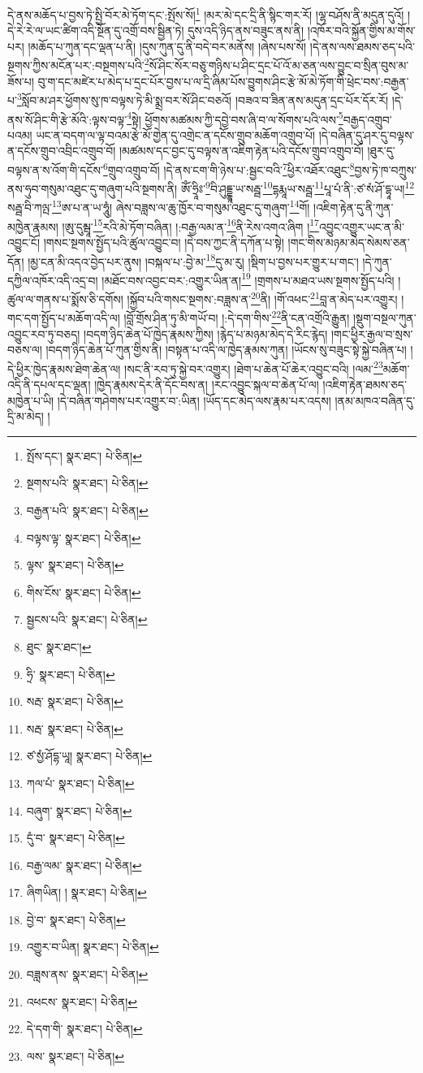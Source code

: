 དེ་ནས་མཆོད་པ་བྱས་ཏེ་སྤྱི་བོར་མེ་ཏོག་དང་:སྤོས་སོ།\footnote{སྤོས་དང་།  སྣར་ཐང་།  པེ་ཅིན། } །མར་མེ་དང་དྲི་ནི་སྙིང་གར་རོ། །ལྷ་བཤོས་ནི་མདུན་དུའོ། །དེ་རེ་རེ་ལ་ཡང་ཚིག་འདི་སྔོན་དུ་འགྲོ་བས་སྦྱིན་ཏེ། དུས་འདི་ཉིད་ནས་བཟུང་ནས་ནི། །འཁོར་བའི་སྐྱོན་གྱིས་མ་གོས་པར། །མཆོད་པ་ཀུན་དང་ལྡན་པ་ནི། །དུས་ཀུན་དུ་ནི་བདེ་བར་མནོས། །ཞེས་པས་སོ། །དེ་ནས་ལས་ཐམས་ཅད་པའི་སྔགས་ཀྱིས་མངོན་པར་:བསྔགས་པའི་\footnote{སྔགས་པའི་  སྣར་ཐང་།  པེ་ཅིན། }སོ་ཤིང་སོར་བཅུ་གཉིས་པ་ཤིང་དྲང་པོ་འོ་མ་ཅན་ལས་བྱུང་བ་སྲིན་བུས་མ་ཟོས་པ། བུ་ག་དང་མཛེར་པ་མེད་པ་དྲང་པོར་བྱས་པ་ལ་དྲི་ཞིམ་པོས་བྱུགས་ཤིང་རྩེ་མོ་མེ་ཏོག་གི་ཕྲེང་བས་:བརྒྱན་པ་\footnote{བརྒྱན་པའི་  སྣར་ཐང་།  པེ་ཅིན། }སློབ་མ་ཤར་ཕྱོགས་སུ་ཁ་བལྟས་ཏེ་མི་སྨྲ་བར་སོ་ཤིང་བཅའོ། །བཟའ་བ་ཟིན་ནས་མདུན་དྲང་པོར་དོར་རོ། །དེ་ནས་སོ་ཤིང་གི་རྩེ་མོའི་:ལྟས་བལྟ་\footnote{བལྟས་ལྟ་  སྣར་ཐང་།  པེ་ཅིན། }སྟེ། ཕྱོགས་མཚམས་ཀྱི་དབྱེ་བས་ཞི་བ་ལ་སོགས་པའི་ལས་\footnote{ལྟས་  སྣར་ཐང་།  པེ་ཅིན། }བརྒྱད་འགྲུབ་པའམ། ཡང་ན་བདག་ལ་ལྟ་བའམ་རྩེ་མོ་གྱེན་དུ་འགྲེང་ན་དངོས་གྲུབ་མཆོག་འགྲུབ་པོ། །དེ་བཞིན་དུ་ཤར་དུ་བལྟས་ན་དངོས་གྲུབ་འབྲིང་འགྲུབ་བོ། །མཚམས་དང་བྱང་དུ་བལྟས་ན་འཇིག་རྟེན་པའི་དངོས་གྲུབ་འགྲུབ་བོ། །ཐུར་དུ་བལྟས་ན་ས་འོག་གི་དངོས་\footnote{གིས་ངོས་  སྣར་ཐང་།  པེ་ཅིན། }གྲུབ་འགྲུབ་བོ། །དེ་ནས་ངག་གི་ཉེས་པ་:སྦྱང་བའི་\footnote{སྦྱངས་པའི་  སྣར་ཐང་།  པེ་ཅིན། }ཕྱིར་འཐོར་འཐུང་\footnote{ཐུང་  སྣར་ཐང་། }བྱས་ཏེ་ཁ་བཀྲུས་ནས་ཧུབ་གསུམ་འཐུང་དུ་གཞུག་པའི་སྔགས་ནི། ཨོཾ་ཧྲཱིཿ་\footnote{ཧྲི་  སྣར་ཐང་།  པེ་ཅིན། }བི་ཤུདྡྷཱ་ཡ་སརྦྦ་\footnote{སརྦ་  སྣར་ཐང་།  པེ་ཅིན། }དྷརྨཱཡ་སརྦྦ་\footnote{སརྦ་  སྣར་ཐང་།  པེ་ཅིན། }པཱ་པཾ་ནི་:ཙ་སཾ་ཤོ་དྷཱ་ཡ།\footnote{ཙ་སྱཾ་ཤོདྷ་ཡཱ།  སྣར་ཐང་།  པེ་ཅིན། } སརྦྦ་བི་ཀལྤ་\footnote{ཀལ་པཾ་  སྣར་ཐང་།  པེ་ཅིན། }ཨ་པ་ན་ཡ་ཧཱུཾ། ཞེས་བཟླས་ལ་ཆུ་ཁྱོར་བ་གསུམ་འཐུང་དུ་གཞུག་\footnote{བཞུག་  སྣར་ཐང་།  པེ་ཅིན། }གོ། །འཇིག་རྟེན་དུ་ནི་ཀུན་མཁྱེན་རྣམས། །ཨུ་དུམྦཱ་\footnote{དུཾ་བ་  སྣར་ཐང་།  པེ་ཅིན། }རའི་མེ་ཏོག་བཞིན། །:བརྒྱ་ལམ་ན་\footnote{བརྒྱ་ལམ་  སྣར་ཐང་།  པེ་ཅིན། }ནི་རེས་འགའ་ཞིག །\footnote{ཞིགཡིན། །  སྣར་ཐང་།  པེ་ཅིན། }འབྱུང་འགྱུར་ཡང་ན་མི་འབྱུང་ངོ། །གསང་སྔགས་སྤྱོད་པའི་ཚུལ་འབྱུང་བ། །དེ་བས་ཀྱང་ནི་དཀོན་པ་སྟེ། །གང་གིས་མཉམ་མེད་སེམས་ཅན་དོན། །མྱ་ངན་མི་འདའ་བྱེད་པར་ནུས། །བསྐལ་པ་:བྱེ་མ་\footnote{བྱེ་བ་  སྣར་ཐང་།  པེ་ཅིན། }དུ་མ་རུ། །སྡིག་པ་བྱས་པར་གྱུར་པ་གང་། །དེ་ཀུན་དཀྱིལ་འཁོར་འདི་འདྲ་བ། །མཐོང་བས་འབྱང་བར་:འགྱུར་ཡིན་ན།\footnote{འགྱུར་བ་ཡིན།  སྣར་ཐང་།  པེ་ཅིན། } །གྲགས་པ་མཐའ་ཡས་སྔགས་སྤྱོད་པའི། །ཚུལ་ལ་གནས་པ་སྨོས་ཅི་དགོས། །སྐྱོབ་པའི་གསང་སྔགས་:བཟླས་ན་\footnote{བཟླས་ནས་  སྣར་ཐང་།  པེ་ཅིན། }ནི། །གོ་འཕང་\footnote{འཕངས་  སྣར་ཐང་།  པེ་ཅིན། }བླ་ན་མེད་པར་འགྱུར། །གང་དག་སྤྱོད་པ་མཆོག་འདི་ལ། །བློ་གྲོས་ཤིན་ཏུ་མི་གཡོ་བ། །:དེ་དག་གིས་\footnote{དེ་དག་གི་  སྣར་ཐང་།  པེ་ཅིན། }ནི་ངན་འགྲོའི་རྒྱུན། །སྡུག་བསྔལ་ཀུན་འབྱུང་རབ་ཏུ་བཅད། །བདག་ཉིད་ཆེན་པོ་ཁྱེད་རྣམས་ཀྱིས། །རྙེད་པ་མཉམ་མེད་དེ་རིང་རྙེད། །གང་ཕྱིར་རྒྱལ་བ་སྲས་བཅས་ལ། །བདག་ཉིད་ཆེན་པོ་ཀུན་གྱིས་ནི། །བསྟན་པ་འདི་ལ་ཁྱེད་རྣམས་ཀུན། །ཡོངས་སུ་བཟུང་སྟེ་སྐྱེ་བཞིན་པ། །དེ་ཕྱིར་ཁྱེད་རྣམས་ཐེག་ཆེན་ལ། །སང་ནི་རབ་ཏུ་སྐྱེ་བར་འགྱུར། །ཐེག་པ་ཆེན་པོ་ཆེར་འབྱུང་བའི། །ལམ་\footnote{ལས་  སྣར་ཐང་།  པེ་ཅིན། }མཆོག་འདི་ནི་དཔལ་དང་ལྡན། །ཁྱེད་རྣམས་དེར་ནི་དོང་བས་ན། །རང་འབྱུང་སྐལ་བ་ཆེན་པོ་ལ། །འཇིག་རྟེན་ཐམས་ཅད་མཁྱེན་པ་ཡི། །དེ་བཞིན་གཤེགས་པར་འགྱུར་བ་:ཡིན། །ཡོད་དང་མེད་ལས་རྣམ་པར་འདས། །ནམ་མཁའ་བཞིན་དུ་དྲི་མ་མེད། །
